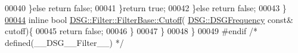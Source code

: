 \begin{DoxyCode}
00040                     \}\textcolor{keywordflow}{else} \textcolor{keywordflow}{return} \textcolor{keyword}{false};
00041                 \}\textcolor{keywordflow}{return} \textcolor{keyword}{true};
00042             \}\textcolor{keywordflow}{else} \textcolor{keywordflow}{return} \textcolor{keyword}{false};
00043         \}
\hypertarget{_filter_8h_source_l00044}{}\hyperlink{class_d_s_g_1_1_filter_1_1_filter_base_a1bf981bd2ca2151791d91b80dda827fe}{00044}         \textcolor{keyword}{inline} \textcolor{keywordtype}{bool} \hyperlink{class_d_s_g_1_1_filter_1_1_filter_base_a1bf981bd2ca2151791d91b80dda827fe}{DSG::Filter::FilterBase::Cutoff}(
      \hyperlink{namespace_d_s_g_a4315a061386fa1014fda09b15d3a6973}{DSG::DSGFrequency} \textcolor{keyword}{const}& cutoff)\{
00045             \textcolor{keywordflow}{return} \textcolor{keyword}{false};
00046         \}
00047     \}
00048 \}
00049 \textcolor{preprocessor}{#endif }\textcolor{comment}{/* defined(\_\_DSG\_\_Filter\_\_) */}\textcolor{preprocessor}{}
\end{DoxyCode}
